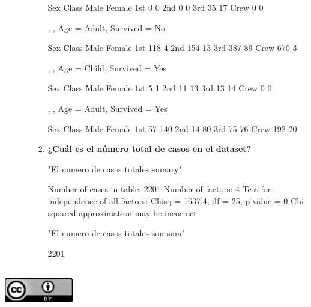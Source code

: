 \documentclass[11pt]{report}
\begin{document}
\begin{enumerate}
\begin{enumerate}
\begin{enumerate}
\begin{Schunk}
\begin{Soutput}
      Sex
Class  Male Female
  1st     0      0
  2nd     0      0
  3rd    35     17
  Crew    0      0

, , Age = Adult, Survived = No

      Sex
Class  Male Female
  1st   118      4
  2nd   154     13
  3rd   387     89
  Crew  670      3

, , Age = Child, Survived = Yes

      Sex
Class  Male Female
  1st     5      1
  2nd    11     13
  3rd    13     14
  Crew    0      0

, , Age = Adult, Survived = Yes

      Sex
Class  Male Female
  1st    57    140
  2nd    14     80
  3rd    75     76
  Crew  192     20
\end{Soutput}
\end{Schunk}

		\item\textbf{¿Cuál es el número total de casos en el dataset?}\\

\begin{Schunk}
\begin{Soutput}
[1] "El numero de casos totales sumary"
\end{Soutput}
\begin{Soutput}
Number of cases in table: 2201 
Number of factors: 4 
Test for independence of all factors:
	Chisq = 1637.4, df = 25, p-value = 0
	Chi-squared approximation may be incorrect
\end{Soutput}
\begin{Soutput}
[1] "El numero de casos totales son sum"
\end{Soutput}
\begin{Soutput}
[1] 2201
\end{Soutput}
\end{Schunk}

	
	\end{enumerate}
	

\end{enumerate}

\end{enumerate}



\newpage
\begin{center}
\includegraphics[width=3cm, height=2cm]{licencia.jpg}
\end{center}
\end{document}
